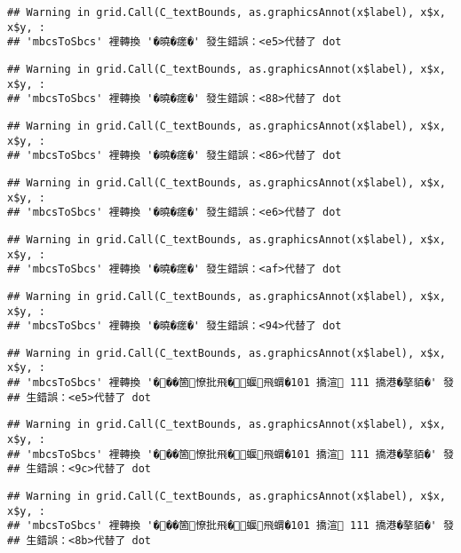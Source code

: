 \documentclass[
]{article}
\begin{document}
\begin{verbatim}
## Warning in grid.Call(C_textBounds, as.graphicsAnnot(x$label), x$x, x$y, :
## 'mbcsToSbcs' 裡轉換 '�曉�瘥�' 發生錯誤：<e5>代替了 dot
\end{verbatim}

\begin{verbatim}
## Warning in grid.Call(C_textBounds, as.graphicsAnnot(x$label), x$x, x$y, :
## 'mbcsToSbcs' 裡轉換 '�曉�瘥�' 發生錯誤：<88>代替了 dot
\end{verbatim}

\begin{verbatim}
## Warning in grid.Call(C_textBounds, as.graphicsAnnot(x$label), x$x, x$y, :
## 'mbcsToSbcs' 裡轉換 '�曉�瘥�' 發生錯誤：<86>代替了 dot
\end{verbatim}

\begin{verbatim}
## Warning in grid.Call(C_textBounds, as.graphicsAnnot(x$label), x$x, x$y, :
## 'mbcsToSbcs' 裡轉換 '�曉�瘥�' 發生錯誤：<e6>代替了 dot
\end{verbatim}

\begin{verbatim}
## Warning in grid.Call(C_textBounds, as.graphicsAnnot(x$label), x$x, x$y, :
## 'mbcsToSbcs' 裡轉換 '�曉�瘥�' 發生錯誤：<af>代替了 dot
\end{verbatim}

\begin{verbatim}
## Warning in grid.Call(C_textBounds, as.graphicsAnnot(x$label), x$x, x$y, :
## 'mbcsToSbcs' 裡轉換 '�曉�瘥�' 發生錯誤：<94>代替了 dot
\end{verbatim}

\begin{verbatim}
## Warning in grid.Call(C_textBounds, as.graphicsAnnot(x$label), x$x, x$y, :
## 'mbcsToSbcs' 裡轉換 '���箇憭批飛�蝘飛蝟�101 撟渲 111 撟港�摮貊�' 發
## 生錯誤：<e5>代替了 dot
\end{verbatim}

\begin{verbatim}
## Warning in grid.Call(C_textBounds, as.graphicsAnnot(x$label), x$x, x$y, :
## 'mbcsToSbcs' 裡轉換 '���箇憭批飛�蝘飛蝟�101 撟渲 111 撟港�摮貊�' 發
## 生錯誤：<9c>代替了 dot
\end{verbatim}

\begin{verbatim}
## Warning in grid.Call(C_textBounds, as.graphicsAnnot(x$label), x$x, x$y, :
## 'mbcsToSbcs' 裡轉換 '���箇憭批飛�蝘飛蝟�101 撟渲 111 撟港�摮貊�' 發
## 生錯誤：<8b>代替了 dot
\end{verbatim}
\end{document}
